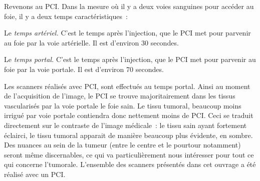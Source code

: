 \documentclass[main.tex]{subfiles}
\begin{document}
Revenons au PCI. Dans la mesure où il y a deux voies sanguines pour accéder au foie, il y a deux temps caractéristiques~:
\begin{myitemize}
\item Le \emph{temps artériel.} C'est le temps après l'injection, que le PCI met pour parvenir au foie par la voie artérielle. Il est d'environ 30 secondes.
\item Le \emph{temps portal.} C'est le temps après l'injection, que le PCI met pour parvenir au foie par la voie portale. Il est d'environ 70 secondes. 
\end{myitemize}
Les scanners réalisés avec PCI, sont effectués au temps portal. Ainsi au moment de l'acquisition de l'image, le PCI se trouve majoritairement dans les tissus vascularisés par la voie portale \ie le foie sain. Le tissu tumoral, beaucoup moins irrigué par voie portale contiendra donc nettement moins de PCI. Ceci se traduit directement sur le contraste de l'image médicale~: le tissu sain ayant fortement éclairci, le tissu tumoral apparait de manière beaucoup plus évidente, en sombre. 
Des nuances au sein de la tumeur (entre le centre et le pourtour notamment) seront même discernables, ce qui va particulièrement nous intéresser pour tout ce qui concerne l'\hetero tumorale. L'ensemble des scanners présentés dans cet ouvrage a été réalisé avec un PCI.
\end{document}
